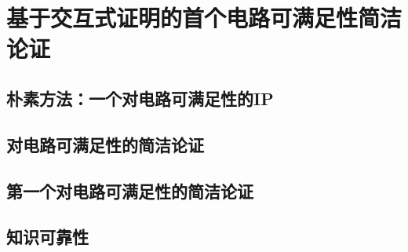 \chapter{基于交互式证明的首个电路可满足性简洁论证}\label{chp:07argfromip}

\section{朴素方法：一个对电路可满足性的IP}\label{7.1}
\section{对电路可满足性的简洁论证}\label{7.2}
\section{第一个对电路可满足性的简洁论证}\label{7.3}
\section{知识可靠性}\label{7.4}